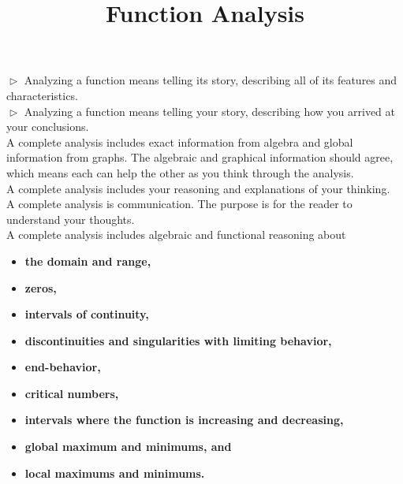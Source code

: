 \documentclass{ximera}
\title{Function Analysis}
\begin{document}
\begin{abstract}
\end{abstract}
\maketitle




\textbf{\textcolor{blue!55!black}{$\vartriangleright$}}  Analyzing a function means telling its story, describing all of its features and characteristics.  \\


\textbf{\textcolor{blue!55!black}{$\vartriangleright$}} Analyzing a function means telling your story, describing how you arrived at your conclusions. \\ 






A complete analysis includes exact information from algebra and global information from graphs.  The algebraic and graphical information should agree, which means each can help the other as you think through the analysis.\\




A complete analysis includes your reasoning and explanations of your thinking.\\


A complete analysis is communication.  The purpose is for the reader to understand your thoughts. \\





A complete analysis includes algebraic and functional reasoning about 


\begin{itemize}
\item \textbf{\textcolor{blue!55!black}{the domain and range,}} 
\item \textbf{\textcolor{blue!55!black}{zeros,}} 
\item \textbf{\textcolor{blue!55!black}{intervals of continuity,}} 
\item \textbf{\textcolor{blue!55!black}{discontinuities and singularities with limiting behavior,}} 
\item \textbf{\textcolor{blue!55!black}{end-behavior,}} 
\item \textbf{\textcolor{blue!55!black}{critical numbers,}} 
\item \textbf{\textcolor{blue!55!black}{intervals where the function is increasing and decreasing,}} 
\item \textbf{\textcolor{blue!55!black}{global maximum and minimums, and}} 
\item \textbf{\textcolor{blue!55!black}{local maximums and minimums.}} 
\end{itemize}
\end{document}

